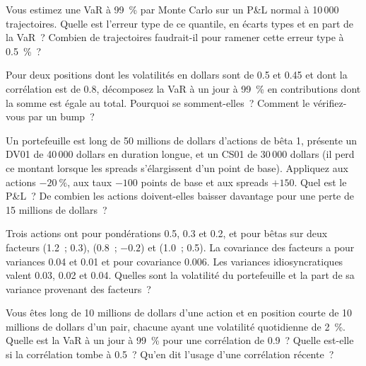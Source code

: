 \begin{question}\label{iq:iv2:risk-validation-and-regulation:16}
Vous estimez une VaR à 99~\% par Monte Carlo sur un P\&L normal à 10\,000 trajectoires. Quelle est l'erreur type de ce quantile, en écarts types et en part de la VaR~? Combien de trajectoires faudrait-il pour ramener cette erreur type à 0.5~\%~?
\end{question}

\begin{question}\label{iq:iv2:risk-validation-and-regulation:17}
Pour deux positions dont les volatilités en dollars sont de 0.5 et 0.45 et dont la corrélation est de 0.8, décomposez la VaR à un jour à 99~\% en contributions dont la somme est égale au total. Pourquoi se somment-elles~? Comment le vérifiez-vous par un bump~?
\end{question}

\begin{question}\label{iq:iv2:risk-validation-and-regulation:18}
Un portefeuille est long de 50 millions de dollars d'actions de bêta 1, présente un DV01 de 40\,000 dollars en duration longue, et un CS01 de 30\,000 dollars (il perd ce montant lorsque les spreads s'élargissent d'un point de base). Appliquez aux actions $-20~\%$, aux taux $-100$ points de base et aux spreads $+150$. Quel est le P\&L~? De combien les actions doivent-elles baisser davantage pour une perte de 15 millions de dollars~?
\end{question}

\begin{question}\label{iq:iv2:risk-validation-and-regulation:19}
Trois actions ont pour pondérations 0.5, 0.3 et 0.2, et pour bêtas sur deux facteurs (1.2~; 0.3), (0.8~; $-0.2$) et (1.0~; 0.5). La covariance des facteurs a pour variances 0.04 et 0.01 et pour covariance 0.006. Les variances idiosyncratiques valent 0.03, 0.02 et 0.04. Quelles sont la volatilité du portefeuille et la part de sa variance provenant des facteurs~?
\end{question}

\begin{question}\label{iq:iv2:risk-validation-and-regulation:20}
Vous êtes long de 10 millions de dollars d'une action et en position courte de 10 millions de dollars d'un pair, chacune ayant une volatilité quotidienne de 2~\%. Quelle est la VaR à un jour à 99~\% pour une corrélation de 0.9~? Quelle est-elle si la corrélation tombe à 0.5~? Qu'en dit l'usage d'une corrélation récente~?
\end{question}

